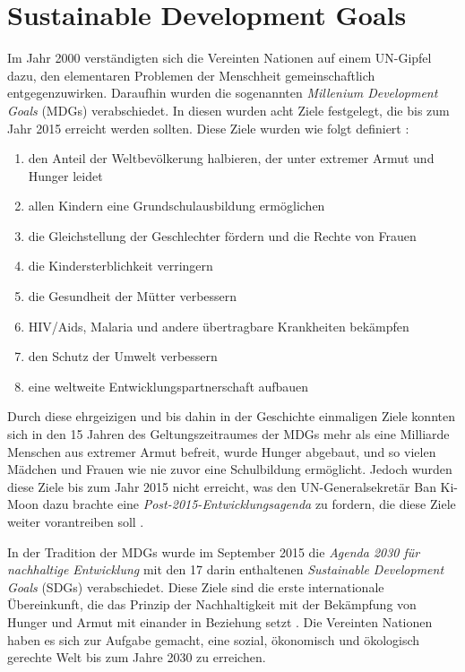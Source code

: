 \documentclass[a4paper,11pt]{article}
\begin{document}
\section{Sustainable Development Goals}
Im Jahr 2000 verständigten sich die Vereinten Nationen auf einem UN-Gipfel
dazu, den elementaren Problemen der Menschheit gemeinschaftlich
entgegenzuwirken. Daraufhin wurden die sogenannten \emph{Millenium Development
  Goals} (MDGs) verabschiedet. In diesen wurden acht Ziele festgelegt, die bis
zum Jahr 2015 erreicht werden sollten. Diese Ziele wurden wie folgt definiert
\cite{BMZ}:

\begin{enumerate}
\item den Anteil der Weltbevölkerung halbieren, der unter extremer Armut und
  Hunger leidet
\item allen Kindern eine Grundschulausbildung ermöglichen
\item die Gleichstellung der Geschlechter fördern und die Rechte von Frauen
\item die Kindersterblichkeit verringern
\item die Gesundheit der Mütter verbessern
\item HIV/Aids, Malaria und andere übertragbare Krankheiten bekämpfen
\item den Schutz der Umwelt verbessern
\item eine weltweite Entwicklungspartnerschaft aufbauen
\end{enumerate}

Durch diese ehrgeizigen und bis dahin in der Geschichte einmaligen Ziele
konnten sich in den 15 Jahren des Geltungszeitraumes der MDGs mehr als eine
Milliarde Menschen aus extremer Armut befreit, wurde Hunger abgebaut, und so
vielen Mädchen und Frauen wie nie zuvor eine Schulbildung ermöglicht. Jedoch
wurden diese Ziele bis zum Jahr 2015 nicht erreicht, was den
UN-Generalsekretär Ban Ki-Moon dazu brachte eine
\emph{Post-2015-Entwicklungsagenda} zu fordern, die diese Ziele weiter
vorantreiben soll \cite{UN}.

In der Tradition der MDGs wurde im September 2015 die \emph{Agenda 2030 für
  nachhaltige Entwicklung} mit den 17 darin enthaltenen \emph{Sustainable
  Development Goals} (SDGs) verabschiedet. Diese Ziele sind die erste
internationale Übereinkunft, die das Prinzip der Nachhaltigkeit mit der
Bekämpfung von Hunger und Armut mit einander in Beziehung setzt \cite{BMZ}.
Die Vereinten Nationen haben es sich zur Aufgabe gemacht, eine sozial,
ökonomisch und ökologisch gerechte Welt bis zum Jahre 2030 zu erreichen.
\end{document}
